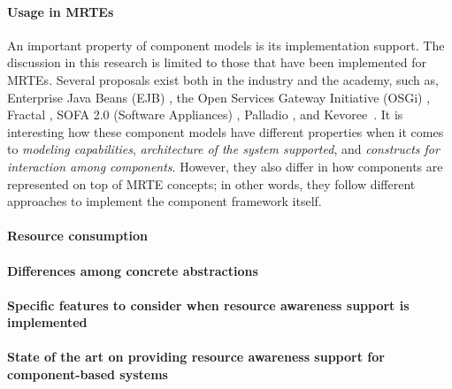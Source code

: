 \paragraph{Usage in MRTEs}
An important property of component models is its implementation support.
The discussion in this research is limited to those that have been implemented for MRTEs.
Several proposals exist both in the industry and the academy, such as,  Enterprise Java Beans (EJB) \cite{OracleEJB3.0}, the Open Services Gateway Initiative (OSGi) \cite{OSGI:r5}, 
Fractal \cite{Bruneton:2006:FCM:1152333.1152345}, 
SOFA 2.0 (Software Appliances) \cite{Bures2006}, Palladio \cite{}, and Kevoree~\cite{morin09a,leger2010reliable}.
It is interesting how these component models have different properties when it comes to \textit{modeling capabilities}, \textit{architecture of the system supported}, and \textit{constructs for interaction among components}.
However, they also differ in how components are represented on top of MRTE concepts; in other words, they follow different approaches to implement the component framework itself.

\paragraph{Resource consumption}

\paragraph{Differences among concrete abstractions}

\paragraph{Specific features to consider when resource awareness support is implemented}

\paragraph{State of the art on providing resource awareness support for component-based systems}



